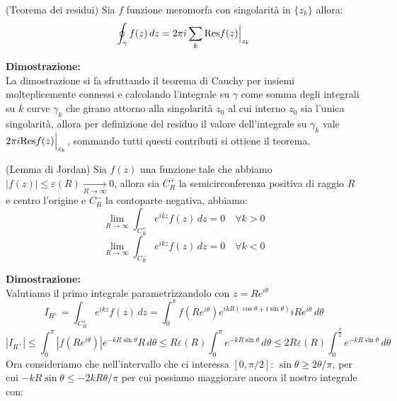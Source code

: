 \begin{thm}
(Teorema dei residui) Sia $f$ funzione meromorfa con singolarità in $\{z_k\}$ allora:
\[\oint_\gamma f(z)\,dz = 2\pi i \sum_k \text{Res}f(z)\Big|_{z_k}\]
\end{thm}
\hspace{-1.6em}\textbf{Dimostrazione:}\\
La dimostrazione si fa sfruttando il teorema di Cauchy per insiemi molteplicemente connessi e calcolando l'integrale su $\gamma$ come somma degli integrali su $k$ curve $\gamma_k$ che girano attorno alla singolarità $z_0$ al cui interno $z_0$ sia l'unica singolarità, allora per definizione del residuo il valore dell'integrale su $\gamma_k$ vale $2\pi i \text{Res}f(z)\Big|_{z_k}$, sommando tutti questi contributi si ottiene il teorema.\\
\begin{lem}
(Lemma di Jordan) Sia $f(z)$ una funzione tale che abbiamo $|f(z)| \leq \varepsilon(R) \xrightarrow[R\to \infty]{} 0$, allora sia $C_R^+$ la semicirconferenza positiva di raggio $R$ e centro l'origine e $C_R^-$ la contoparte negativa, abbiamo:
\[\lim_{R\to \infty}\int_{C_R^+}e^{ikz}f(z)\,dz = 0 \quad \forall k>0\]
\[\lim_{R\to \infty}\int_{C_R^-}e^{ikz}f(z)\,dz = 0 \quad \forall k<0\]
\end{lem}
\hspace{-1.6em}\textbf{Dimostrazione:}\\
Valutiamo il primo integrale parametrizzandolo con $z=Re^{i\theta}$
\[I_{R^+} = \int_{C_R^+}e^{ikz}f(z)\,dz = \int_0^\pi f(Re^{i\theta})e^{ikR(\cos\theta+i\sin\theta)} iRe^{i\theta}\,d\theta \]
\[|I_{R^+}| \leq \int_0^\pi |f(Re^{i\theta})|e^{-kR\sin\theta}R\,d\theta\leq R\varepsilon(R)\int_0^\pi e^{-kR\sin\theta}\,d\theta\leq 2R\varepsilon(R)\int_0^{\frac{\pi}{2}} e^{-kR\sin\theta}\,d\theta\]
Ora consideriamo che nell'intervallo che ci interessa $[0,\pi/2]$: $\sin\theta \geq 2\theta/\pi$, per cui $-kR\sin\theta\leq -2kR\theta/\pi$ per cui possiamo maggiorare ancora il nostro integrale con:

